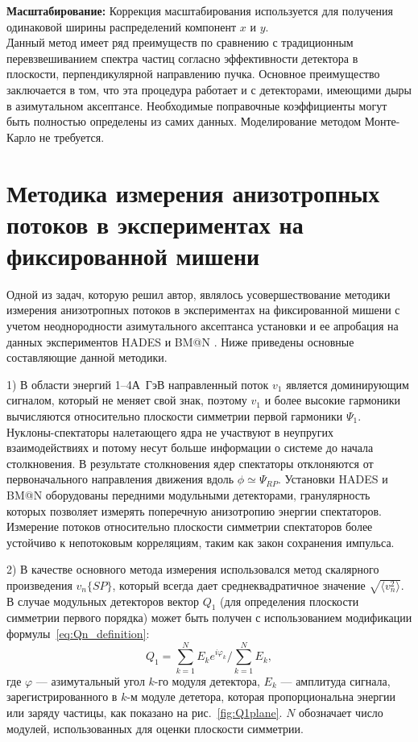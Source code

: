 {\bf Масштабирование:} 
Коррекция масштабирования используется для получения одинаковой ширины распределений компонент $x$ и $y$.\\

Данный метод имеет ряд преимуществ по сравнению с традиционным перевзвешиванием спектра частиц согласно эффективности детектора в плоскости, перпендикулярной направлению пучка.
Основное преимущество заключается в том, что эта процедура работает и с детекторами, имеющими дыры в азимутальном аксептансе.
Необходимые поправочные коэффициенты могут быть полностью определены из самих данных. Моделирование методом Монте-Карло не требуется.

\section{Методика измерения анизотропных потоков в экспериментах на фиксированной мишени \label{method}}

Одной из задач, которую решил автор, являлось усовершествование  методики измерения анизотропных потоков в экспериментах на фиксированной мишени с учетом неоднородности азимутального аксептанса установки и  ее апробация на данных экспериментов HADES \cite{Mamaev:2020qom,HADES:2020lob,Mamaev:2020lpi,Mamaev:2024-1,Mamaev:2024-2} и BM@N \cite{Mamaev:2024,Mamaev:2023yhz,Mamaev:2023fpr,doi:10.1142/S021830132441009X}. 
Ниже приведены основные составляющие данной методики.

1) В области энергий 1--4$А$~ГэВ направленный поток $v_1$ является доминирующим сигналом, который не меняет свой знак, поэтому $v_1$ и более высокие гармоники вычисляются относительно плоскости симметрии первой гармоники $\Psi_{1}$. 
Нуклоны-спектаторы налетающего ядра не участвуют в неупругих взаимодействиях и потому несут больше информации о системе до начала столкновения. 
В результате столкновения ядер спектаторы отклоняются от первоначального направле­ния движения вдоль $\phi \simeq \Psi_{RP}$.  
Установки HADES и BM@N  оборудованы передними модульными детекторами, гранулярность которых позволяет измерять поперечную анизотропию энергии спектаторов.
Измерение потоков относительно плоскости симметрии спектаторов  более устойчиво к непотоковым корреляциям, таким как закон сохранения импульса.

2) В качестве основного метода измерения использовался метод скалярного произведения $v_n\{SP\}$, который всегда дает среднеквадратичное значение  $\sqrt{ \langle v_n^2 \rangle }$. 
В случае модульных детекторов вектор $Q_1$ (для определения плоскости симметрии первого порядка) может быть получен с использованием модификации формулы~\ref{eq:Qn_definition}:
\begin{equation}
Q_1 = \sum_{k=1}^{N} E_k e^{i\varphi_k} / \sum_{k=1}^{N} E_k,
\label{eq:module_vector}
\end{equation}
где $\varphi$ --- азимутальный угол $k$-го модуля детектора, $E_k$ --- амплитуда сигнала, зарегистрированного в
$k$-м модуле дететора, которая пропорциональна энергии или заряду частицы, как показано на рис.~\ref{fig:Q1plane}.
$N$ обозначает число модулей, использованных для оценки плоскости симметрии.

